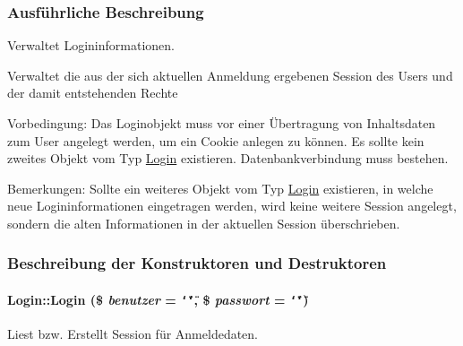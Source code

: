 \subsubsection{Ausf\"{u}hrliche Beschreibung}
Verwaltet Logininformationen. 

Verwaltet die aus der sich aktuellen Anmeldung ergebenen Session des Users und der damit entstehenden Rechte \begin{Desc}
\item[Vorbedingung:]Das Loginobjekt muss vor einer Übertragung von Inhaltsdaten zum User angelegt werden, um ein Cookie anlegen zu können. Es sollte kein zweites Objekt vom Typ \hyperlink{classLogin}{Login} existieren. Datenbankverbindung muss bestehen. \end{Desc}
\begin{Desc}
\item[Bemerkungen:]Sollte ein weiteres Objekt vom Typ \hyperlink{classLogin}{Login} existieren, in welche neue Logininformationen eingetragen werden, wird keine weitere Session angelegt, sondern die alten Informationen in der aktuellen Session überschrieben. \end{Desc}




\subsubsection{Beschreibung der Konstruktoren und Destruktoren}
\hypertarget{classLogin_5d83c782459f6389f350666eb102974d}{
\paragraph[Login]{\setlength{\rightskip}{0pt plus 5cm}Login::Login (\$ {\em benutzer} = {\tt \char`\"{}\char`\"{}}, \$ {\em passwort} = {\tt \char`\"{}\char`\"{}})}\hfill}
\label{classLogin_5d83c782459f6389f350666eb102974d}


Liest bzw. Erstellt Session für Anmeldedaten. 

